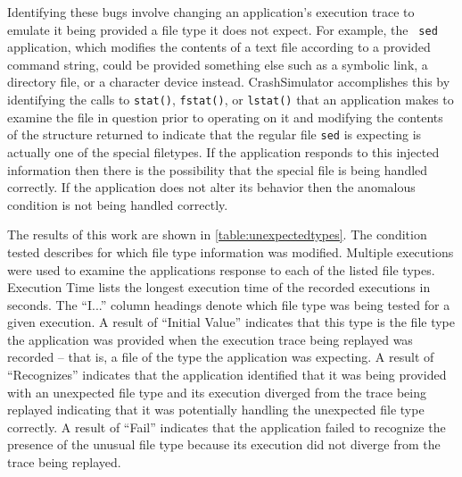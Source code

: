 Identifying these bugs involve changing an application's execution trace to
emulate it being provided a file type it does not expect.  For example, the {\tt
  sed} application, which modifies the contents of a text file according to a
provided command string, could be provided something else such as a symbolic
link, a directory file, or a character device instead.  CrashSimulator
accomplishes this by identifying the calls to {\tt stat()}, {\tt fstat()}, or
{\tt lstat()}  that an application makes to examine the file in question prior
to operating on it and modifying the contents of the structure returned to
indicate that the regular file {\tt sed} is expecting is actually one of the
special filetypes.  If the application responds to this injected information
then there is the possibility that the special file is being handled correctly.
If the application does not alter its behavior then the anomalous condition is
not being handled correctly.

The results of this work are shown in \ref{table:unexpectedtypes}.  The
condition tested describes for which file type information was modified.
Multiple executions were used to examine the applications response to each of
the listed file types. Execution Time lists the longest execution time of the
recorded executions in seconds. The ``I...'' column headings denote which file
type was being tested for a given execution.  A result of ``Initial Value''
indicates that this type is the file type the application was provided when the
execution trace being replayed was recorded -- that is, a file of the type the
application was expecting.  A result of ``Recognizes'' indicates that the
application identified that it was being provided with an unexpected file type
and its execution diverged from the trace being replayed indicating that it was
potentially handling the unexpected file type correctly.  A result of ``Fail''
indicates that the application failed to recognize the presence of the unusual
file type because its execution did not diverge from the trace being replayed.


